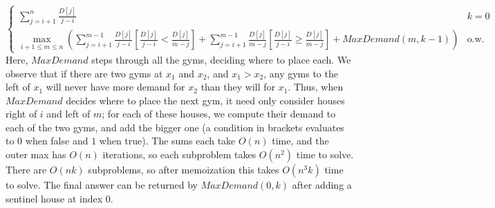 \documentclass[fleqn]{article}
\begin{document}
\begin{enumerate}
\begin{answer}
\[\begin{cases}
                \sum_{j=i+1}^{n}\frac{D[j]}{j-i} & k = 0 \\
                \max_{i + 1 \leq m \leq n} \left(\sum_{j=i+1}^{m-1} \frac{D[j]}{j-i}\left[\frac{D[j]}{j-i} < \frac{D[j]}{m-j}\right] + \sum_{j=i+1}^{m-1} \frac{D[j]}{m-j}\left[\frac{D[j]}{j-i} \geq \frac{D[j]}{m-j}\right] + MaxDemand(m,k-1)\right) & \text{o.w.}
            \end{cases}
        \]
        Here, $MaxDemand$ steps through all the gyms, deciding where to place each. We observe that if there are two gyms at $x_1$ and $x_2$, and $x_1 > x_2$, any gyms to the left of $x_1$ will never have more demand for $x_2$ than they will for $x_1$. Thus, when $MaxDemand$ decides where to place the next gym, it need only consider houses right of $i$ and left of $m$; for each of these houses, we compute their demand to each of the two gyms, and add the bigger one (a condition in brackets evaluates to $0$ when false and $1$ when true). The sums each take $O(n)$ time, and the outer max has $O(n)$ iterations, so each subproblem takes $O(n^2)$ time to solve. There are $O(nk)$ subproblems, so after memoization this takes $O(n^3 k)$ time to solve. The final answer can be returned by $MaxDemand(0,k)$ after adding a sentinel house at index $0$.
    \end{answer}
\end{enumerate}
\end{document}

